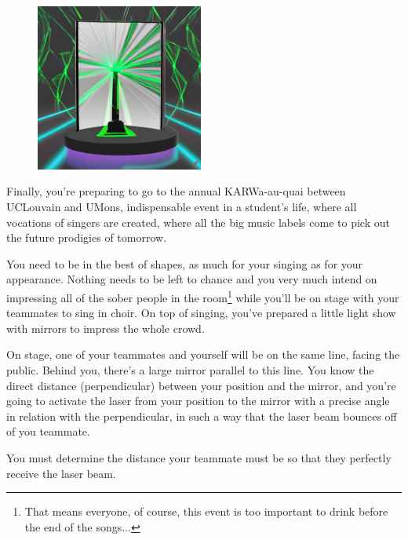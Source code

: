 \problemname{\problemyamlname}

\begin{figure}
    \centering
    \includegraphics[width=5.5cm]{mirror.jpg}
\end{figure}

Finally, you're preparing to go to the annual KARWa-au-quai between UCLouvain and UMons, indispensable event in a student's life, where all vocations of singers are created, where all the big music labels come to pick out the future prodigies of tomorrow.

You need to be in the best of shapes, as much for your singing as for your appearance.
Nothing needs to be left to chance and you very much intend on impressing all of the sober people in the room\footnote{That means everyone, of course, this event is too important to drink before the end of the songs...} while you'll be on stage with your teammates to sing in choir.
On top of singing, you've prepared a little light show with mirrors to impress the whole crowd.

On stage, one of your teammates and yourself will be on the same line, facing the public.
Behind you, there's a large mirror parallel to this line.
You know the direct distance (perpendicular) between your position and the mirror, and you're going to activate the laser from your position to the mirror with a precise angle in relation with the perpendicular, in such a way that the laser beam bounces off of you teammate.

You must determine the distance your teammate must be so that they perfectly receive the laser beam.

